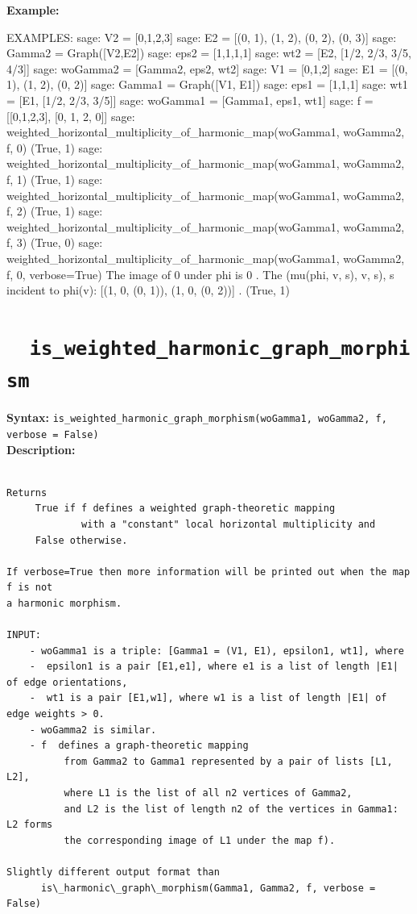 \documentclass{article}
\begin{document}
\noindent
\textbf{Example:}
{\small{
\begin{spverbatim}
EXAMPLES:
    sage: V2 = [0,1,2,3]
    sage: E2 = [(0, 1), (1, 2), (0, 2), (0, 3)]
    sage: Gamma2 = Graph([V2,E2])
    sage: eps2 = [1,1,1,1]
    sage: wt2 = [E2, [1/2, 2/3, 3/5, 4/3]]
    sage: woGamma2 = [Gamma2, eps2, wt2]
    sage: V1 = [0,1,2]
    sage: E1 = [(0, 1), (1, 2), (0, 2)]
    sage: Gamma1 = Graph([V1, E1])
    sage: eps1 = [1,1,1]
    sage: wt1 = [E1, [1/2, 2/3, 3/5]]
    sage: woGamma1 = [Gamma1, eps1, wt1]
    sage: f = [[0,1,2,3], [0, 1, 2, 0]]
    sage: weighted_horizontal_multiplicity_of_harmonic_map(woGamma1, woGamma2, f, 0)
     (True, 1)
    sage: weighted_horizontal_multiplicity_of_harmonic_map(woGamma1, woGamma2, f, 1)
     (True, 1)
    sage: weighted_horizontal_multiplicity_of_harmonic_map(woGamma1, woGamma2, f, 2)
     (True, 1)
    sage: weighted_horizontal_multiplicity_of_harmonic_map(woGamma1, woGamma2, f, 3)
     (True, 0)
    sage: weighted_horizontal_multiplicity_of_harmonic_map(woGamma1, woGamma2, f, 0, verbose=True)
     The image of  0  under phi is  0 .   The (mu(phi, v, s), v, s), s incident to phi(v):   [(1, 0, (0, 1)), (1, 0, (0, 2))] .
     (True, 1)
\end{spverbatim}
}}

\section{\tt \ \ is\_weighted\_harmonic\_graph\_morphism}

\textbf{Syntax:} \verb}is_weighted_harmonic_graph_morphism(woGamma1, woGamma2, f, verbose = False)}\\

\textbf{Description:}
\begin{verbatim}

Returns 
     True if f defines a weighted graph-theoretic mapping
             with a "constant" local horizontal multiplicity and 
     False otherwise. 

If verbose=True then more information will be printed out when the map f is not 
a harmonic morphism.

INPUT:
    - woGamma1 is a triple: [Gamma1 = (V1, E1), epsilon1, wt1], where 
    -  epsilon1 is a pair [E1,e1], where e1 is a list of length |E1| of edge orientations,
    -  wt1 is a pair [E1,w1], where w1 is a list of length |E1| of edge weights > 0.
    - woGamma2 is similar.
    - f  defines a graph-theoretic mapping
          from Gamma2 to Gamma1 represented by a pair of lists [L1, L2],
          where L1 is the list of all n2 vertices of Gamma2,
          and L2 is the list of length n2 of the vertices in Gamma1: L2 forms 
          the corresponding image of L1 under the map f).

Slightly different output format than
      is\_harmonic\_graph\_morphism(Gamma1, Gamma2, f, verbose = False)

\end{verbatim}
\end{document}
